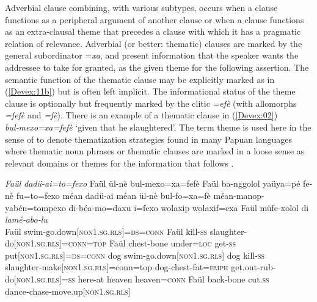 \documentclass[output=paper]{LSP/langsci}
\begin{document}
Adverbial clause combining, with various subtypes, occurs when a clause functions as a peripheral argument of another clause or when a clause functions as an extra-clausal theme that precedes a clause with which it has a pragmatic relation of relevance. Adverbial (or better: thematic) clauses are marked by the general subordinator =\textit{xa}, and present information that the speaker wants the addressee to take for granted, as the given theme for the following assertion. The semantic function of the thematic clause may be explicitly marked as in (\ref{Devex:11b}) but is often left implicit. The informational status of the theme clause is optionally but frequently marked by the  clitic \textit{=efè} (with allomorphs \textit{=fefè} and \textit{=fè}). There is an example of a thematic clause in (\ref{Devex:02}) \textit{bul‑mexo=xa=fefè} `given that he slaughtered'. The term theme is used here in the sense of \citet{Heeschen98} to denote thematization strategies found in many Papuan languages where thematic noun phrases or thematic clauses are marked in a loose sense as relevant domains or themes for the information that follows \citep[][814--816]{devries.2006}.


\begin{exe}
\ex \label{Devex:02}
\gll \textit{Faül} \textit{dadü-ai=to=fexo} Faül ül-nè bul-mexo=xa=fefè Faül ba-nggolol yaüya=pé fe-nè	fu=to=fexo méan dadü-ai méan ül-nè bul-fo=xa=fè méan-manop-yabén=tompexo di-béa-mo=daxu i=fexo wolaxip wolaxif=exa Faül müfe‑xolol di \textit{lamé‑abo‑lu}\\
Faül swim-go.down[\textsc{non1.sg.rls}]=\textsc{ds}=\textsc{conn} Faül kill-\textsc{ss} slaughter-do[\textsc{non1.sg.rls}]=\textsc{conn}=\textsc{top} Faül chest-bone under=\textsc{loc} get-\textsc{ss} put[\textsc{non1.sg.rls}]=\textsc{ds}=\textsc{conn} dog swim-go.down[\textsc{non1.sg.rls}] dog kill-\textsc{ss} slaughter‑make[\textsc{non1.sg.rls}]=conn=top dog-chest-fat=\textsc{emph} get.out-rub-do[\textsc{non1.sg.rls}]=\textsc{ss} here-at heaven heaven=\textsc{conn} Faül back‑bone cut.\textsc{ss} dance‑chase‑move.up[\textsc{non1.sg.rls}]\\
\glt {} \citep[][165]{enk97}\\
\end{exe}
\end{document}
